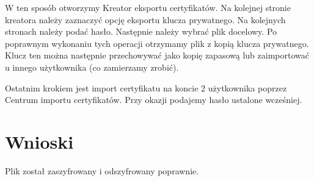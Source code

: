\documentclass[a4paper,twoside,12pt]{mgr}
\begin{document}
W ten sposób otworzymy Kreator eksportu certyfikatów. Na kolejnej stronie kreatora należy zaznaczyć opcję eksportu klucza prywatnego. Na kolejnych stronach należy podać hasło. Następnie należy wybrać plik docelowy. Po poprawnym wykonaniu tych operacji otrzymamy plik z kopią klucza prywatnego. Klucz ten można następnie przechowywać jako kopię zapasową lub zaimportować u innego użytkownika (co zamierzamy zrobić). 
 
Ostatnim krokiem jest import certyfikatu na koncie 2 użytkownika poprzez Centrum importu certyfikatów. Przy okazji podajemy hasło ustalone wcześniej.

\chapter{Wnioski}
Plik został zaszyfrowany i odszyfrowany poprawnie. 
\end{document}
